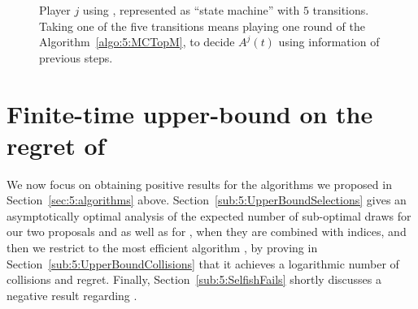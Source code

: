\begin{figure}[h!]
  \caption[``State-machine'' representation of \MCTopM]{Player $j$ using \MCTopM, represented as ``state machine'' with $5$ transitions.
  Taking one of the five transitions means playing one round of the Algorithm~\ref{algo:5:MCTopM}, to decide $A^j(t)$ using information of previous steps.}
  \label{fig:5:StateMachineAlgorithm_MCTopM}
\end{figure}



\section{Finite-time upper-bound on the regret of \MCTopM}
\label{sec:5:upperbounds}

We now focus on obtaining positive results for the algorithms we proposed in Section~\ref{sec:5:algorithms} above.
Section~\ref{sub:5:UpperBoundSelections} gives
an asymptotically optimal analysis of the expected number of sub-optimal draws
for our two proposals \RandTopM{} and \MCTopM{} as well as for \rhoRand{}, when they are combined with \klUCB{} indices,
and then we restrict to the most efficient algorithm \MCTopM, by proving in Section~\ref{sub:5:UpperBoundCollisions} that it achieves a logarithmic number of collisions and regret.
%
Finally, Section~\ref{sub:5:SelfishFails} shortly discusses a negative result regarding \Selfish.


